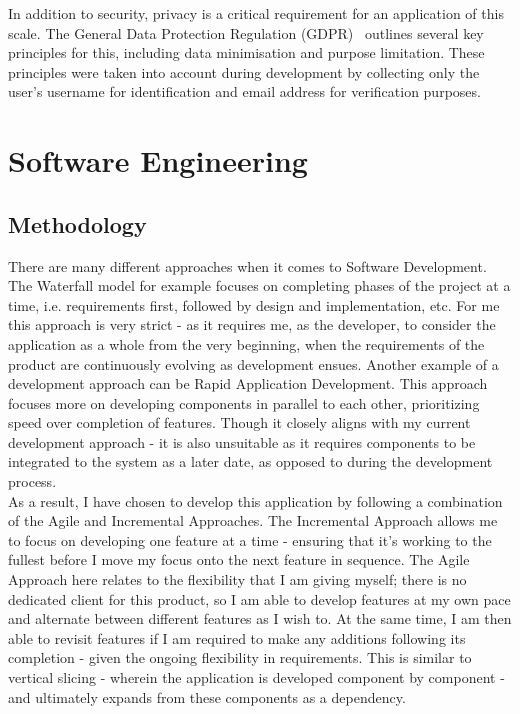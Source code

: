 \documentclass[]{final_report}
\begin{document}
In addition to security, privacy is a critical requirement for an application of this scale. The General Data Protection Regulation (GDPR)~\cite{GDPR} outlines several key principles for this, including data minimisation and purpose limitation. These principles were taken into account during development by collecting only the user's username for identification and email address for verification purposes.

\chapter{Software Engineering}
\section{Methodology}
There are many different approaches when it comes to Software Development. The Waterfall model for example focuses on completing phases of the project at a time, i.e. requirements first, followed by design and implementation, etc. For me this approach is very strict - as it requires me, as the developer, to consider the application as a whole from the very beginning, when the requirements of the product are continuously evolving as development ensues. Another example of a development approach can be Rapid Application Development. This approach focuses more on developing components in parallel to each other, prioritizing speed over completion of features. Though it closely aligns with my current development approach - it is also unsuitable as it requires components to be integrated to the system as a later date, as opposed to during the development process.\\

As a result, I have chosen to develop this application by following a combination of the Agile and Incremental Approaches. The Incremental Approach allows me to focus on developing one feature at a time - ensuring that it's working to the fullest before I move my focus onto the next feature in sequence. The Agile Approach here relates to the flexibility that I am giving myself; there is no dedicated client for this product, so I am able to develop features at my own pace and alternate between different features as I wish to. At the same time, I am then able to revisit features if I am required to make any additions following its completion - given the ongoing flexibility in requirements. This is similar to vertical slicing - wherein the application is developed component by component - and ultimately expands from these components as a dependency.
\end{document}
